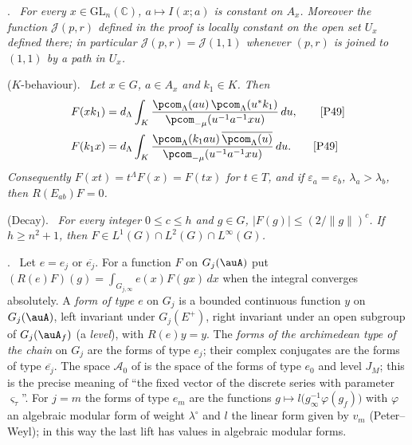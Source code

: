\documentclass[10pt]{amsart}
\theoremstyle{definition}
\theoremstyle{remark}
\newcommand{\C}{\mathbb C}
\providecommand{\auAz}{\mathcal A_0}
\newenvironment{quotedthm}[2]{\par\medskip\noindent\begingroup
  \textbf{#1}#2.\ \itshape\ignorespaces}{\endgroup\par\medskip}
\newenvironment{quoteddef}[2]{\par\medskip\noindent\begingroup
  \textbf{#1}#2.\ \ignorespaces}{\endgroup\par\medskip}
\begin{document}
\begin{quotedthm}{\cite[Proposition~3.21]{P49}}{}
For every $x\in\mathrm{GL}_n(\C)$, $a\mapsto I(x;a)$ is constant on $A_x$. Moreover the function
$\mathcal J(p,r)$ defined in the proof is locally constant on the open set $U_x$ defined there; in
particular $\mathcal J(p,r)=\mathcal J(1,1)$ whenever $(p,r)$ is joined to $(1,1)$ by a path in $U_x$.
\end{quotedthm}

\begin{quotedthm}{\cite[Lemma~3.23]{P49}}{ ($K$-behaviour)}
Let $x\in G$, $a\in A_x$ and $k_1\in K$. Then
\begin{align*}
F(xk_1)&=d_\Lambda\int_K\frac{\pcom_\Lambda(au)\,\pcom_\Lambda(u^*k_1)}{\pcom_{-\mu}(u^{-1}a^{-1}xu)}\,du,
\tag*{{\cite[(16)]{P49}}}\\
F(k_1x)&=d_\Lambda\int_K\frac{\pcom_\Lambda(k_1au)\,\overline{\pcom_\Lambda(u)}}{\pcom_{-\mu}(u^{-1}a^{-1}xu)}
\,du.\tag*{{\cite[(17)]{P49}}}
\end{align*}
Consequently $F(xt)=t^\Lambda F(x)=F(tx)$ for $t\in T$, and if $\varepsilon_a=\varepsilon_b$,
$\lambda_a>\lambda_b$, then $R(E_{ab})F=0$.
\end{quotedthm}

\begin{quotedthm}{\cite[Lemma~3.25]{P49}}{ (Decay)}
For every integer $0\le c\le h$ and $g\in G$, $|F(g)|\le(2/\|g\|)^c$. If $h\ge n^2+1$, then $F\in
L^1(G)\cap L^2(G)\cap L^\infty(G)$.
\end{quotedthm}

\begin{quoteddef}{\cite[Definition~8.1]{P49}}{}
Let $e=e_j$ or $\overline{e_j}$. For a function $F$ on $G_j(\auA)$ put $(R(e)F)(g)=
\int_{G_{j,\infty}}e(x)F(gx)\,dx$ when the integral converges absolutely. A \emph{form of type $e$}
on $G_j$ is a bounded continuous function $y$ on $G_j(\auA)$, left invariant under $G_j(E^+)$, right
invariant under an open subgroup of $G_j(\auA_f)$ (a \emph{level}), with $R(e)y=y$. The
\emph{forms of the archimedean type of the chain} on $G_j$ are the forms of type $e_j$; their
complex conjugates are the forms of type $\overline{e_j}$. The space $\auAz$ of
{\cite[\S14.3]{P46}} is the space of the forms of type $e_0$ and level $J_M$; this is the precise
meaning of ``the fixed vector of the discrete series with parameter $\varsigma_\tau$''. For $j=m$
the forms of type $e_m$ are the functions $g\mapsto l\bigl(g_\infty^{-1}\varphi(g_f)\bigr)$ with
$\varphi$ an algebraic modular form of weight $\lambda^\circ$ and $l$ the linear form given by
$v_m$ (Peter--Weyl); in this way the last lift has values in algebraic modular forms.
\end{quoteddef}
\end{document}
